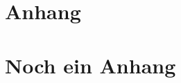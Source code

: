 \appendix
\section{Anhang} %
\label{sec:anhang}


\section{Noch ein Anhang} %
\label{sec:noch_ein_anhang}

